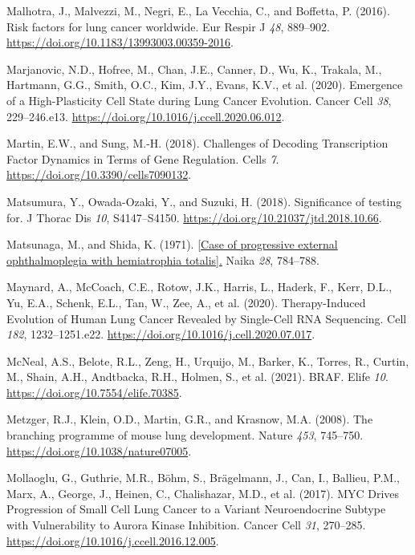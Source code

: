 \begin{CSLReferences}{0}{0}
\leavevmode{}%
Malhotra, J., Malvezzi, M., Negri, E., La Vecchia, C., and Boffetta, P. (2016). Risk factors for lung cancer worldwide. Eur Respir J \emph{48}, 889--902. \url{https://doi.org/10.1183/13993003.00359-2016}.

\leavevmode{}%
Marjanovic, N.D., Hofree, M., Chan, J.E., Canner, D., Wu, K., Trakala, M., Hartmann, G.G., Smith, O.C., Kim, J.Y., Evans, K.V., et al. (2020). Emergence of a High-Plasticity Cell State during Lung Cancer Evolution. Cancer Cell \emph{38}, 229--246.e13. \url{https://doi.org/10.1016/j.ccell.2020.06.012}.

\leavevmode{}%
Martin, E.W., and Sung, M.-H. (2018). Challenges of Decoding Transcription Factor Dynamics in Terms of Gene Regulation. Cells \emph{7}. \url{https://doi.org/10.3390/cells7090132}.

\leavevmode{}%
Matsumura, Y., Owada-Ozaki, Y., and Suzuki, H. (2018). Significance of testing for. J Thorac Dis \emph{10}, S4147--S4150. \url{https://doi.org/10.21037/jtd.2018.10.66}.

\leavevmode{}%
Matsunaga, M., and Shida, K. (1971). \href{https://www.ncbi.nlm.nih.gov/pubmed/5130083}{{[}Case of progressive external ophthalmoplegia with hemiatrophia totalis{]}.} Naika \emph{28}, 784--788.

\leavevmode{}%
Maynard, A., McCoach, C.E., Rotow, J.K., Harris, L., Haderk, F., Kerr, D.L., Yu, E.A., Schenk, E.L., Tan, W., Zee, A., et al. (2020). Therapy-Induced Evolution of Human Lung Cancer Revealed by Single-Cell RNA Sequencing. Cell \emph{182}, 1232--1251.e22. \url{https://doi.org/10.1016/j.cell.2020.07.017}.

\leavevmode{}%
McNeal, A.S., Belote, R.L., Zeng, H., Urquijo, M., Barker, K., Torres, R., Curtin, M., Shain, A.H., Andtbacka, R.H., Holmen, S., et al. (2021). BRAF. Elife \emph{10}. \url{https://doi.org/10.7554/elife.70385}.

\leavevmode{}%
Metzger, R.J., Klein, O.D., Martin, G.R., and Krasnow, M.A. (2008). The branching programme of mouse lung development. Nature \emph{453}, 745--750. \url{https://doi.org/10.1038/nature07005}.

\leavevmode{}%
Mollaoglu, G., Guthrie, M.R., Böhm, S., Brägelmann, J., Can, I., Ballieu, P.M., Marx, A., George, J., Heinen, C., Chalishazar, M.D., et al. (2017). MYC Drives Progression of Small Cell Lung Cancer to a Variant Neuroendocrine Subtype with Vulnerability to Aurora Kinase Inhibition. Cancer Cell \emph{31}, 270--285. \url{https://doi.org/10.1016/j.ccell.2016.12.005}.


\end{CSLReferences}
